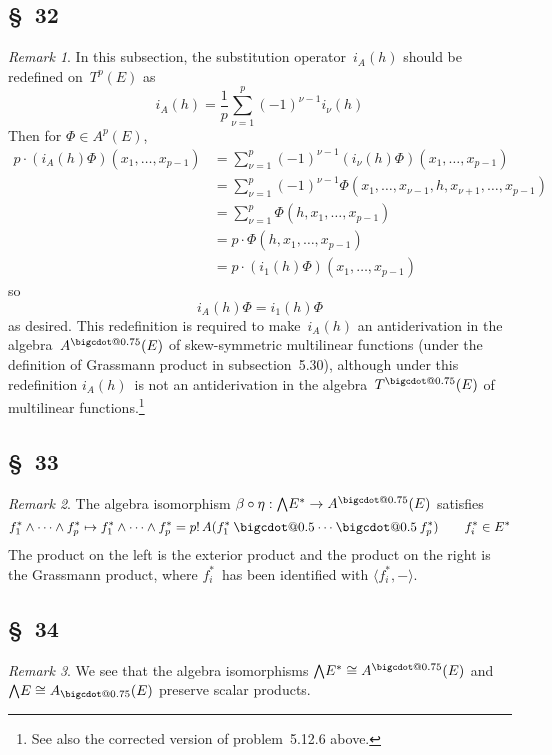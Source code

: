 \documentclass[letterpaper,12pt]{article}
\makeatletter
\newcommand{\iso}{\cong}
\newcommand{\bigcdot}[1]{\mathbin{\mathpalette\bigcdot@{#1}}}
\newcommand{\bigcdot@}[2]{%
  \sbox0{$#1\vcenter{}$}%
  \sbox2{$#1\cdot\m@th$}%
  \hbox{%
    \hfil
    \raise\ht0\hbox{%
      \scalebox{#2}{%
        \lower\ht0\hbox{$#1\bullet\m@th$}%
      }%
    }%
    \hfil
  }%
}
\newcommand{\after}{\circ}
\newcommand{\mult}{\cdot}
\newcommand{\eprod}{\wedge}
\newcommand{\bigeprod}{\bigwedge}
\newcommand{\medeprod}{{\textstyle\bigeprod}}
\newcommand{\fprod}{\bigcdot{0.5}}
\newcommand{\tdot}{\bigcdot{0.75}}
\newcommand{\adot}{\bigcdot{0.75}}
\newcommand{\sprod}[2]{\langle#1,#2\rangle}
\newcommand{\multi}[4]{#2_{#3}#1\cdots#1#2_{#4}}
\newcommand{\eprods}[3]{\multi{\eprod}{#1}{#2}{#3}}
\newcommand{\fprods}[3]{\multi{\fprod}{#1}{#2}{#3}}
\theoremstyle{definition}
\theoremstyle{remark}
\newtheorem*{rmk}{Remark}
\makeatother
\begin{document}
\subsection*{\S~32}
\begin{rmk}
In this subsection, the substitution operator~\(i_A(h)\) should be redefined on~\(T^p(E)\) as
\[i_A(h)=\frac{1}{p}\sum_{\nu=1}^p(-1)^{\nu-1}i_{\nu}(h)\]
Then for \(\Phi\in A^p(E)\),
\begin{align*}
p\mult(i_A(h)\Phi)(x_1,\ldots,x_{p-1})&=\sum_{\nu=1}^p(-1)^{\nu-1}(i_{\nu}(h)\Phi)(x_1,\ldots,x_{p-1})\\
	&=\sum_{\nu=1}^p(-1)^{\nu-1}\Phi(x_1,\ldots,x_{\nu-1},h,x_{\nu+1},\ldots,x_{p-1})\\
	&=\sum_{\nu=1}^p\Phi(h,x_1,\ldots,x_{p-1})\\
	&=p\mult\Phi(h,x_1,\ldots,x_{p-1})\\
	&=p\mult(i_1(h)\Phi)(x_1,\ldots,x_{p-1})
\end{align*}
so
\[i_A(h)\Phi=i_1(h)\Phi\]
as desired. This redefinition is required to make~\(i_A(h)\) an antiderivation in the algebra~\(A^{\adot}(E)\) of skew-symmetric multilinear functions (under the definition of Grassmann product in subsection~5.30), although under this redefinition \(i_A(h)\)~is not an antiderivation in the algebra~\(T^{\tdot}(E)\) of multilinear functions.\footnote{See also the corrected version of problem~5.12.6 above.}
\end{rmk}

\subsection*{\S~33}
\begin{rmk}
The algebra isomorphism \(\beta\after\eta:\medeprod E^*\to A^{\adot}(E)\) satisfies
\[\eprods{f^*}{1}{p}\mapsto\eprods{f^*}{1}{p}=p!\,A(\fprods{f^*}{1}{p})\qquad f^*_i\in E^*\]
The product on the left is the exterior product and the product on the right is the Grassmann product, where \(f^*_i\)~has been identified with \(\sprod{f^*_i}{-}\).
\end{rmk}

\subsection*{\S~34}
\begin{rmk}
We see that the algebra isomorphisms \(\medeprod E^*\iso A^{\adot}(E)\) and \(\medeprod E\iso A_{\adot}(E)\) preserve scalar products.
\end{rmk}
\end{document}
